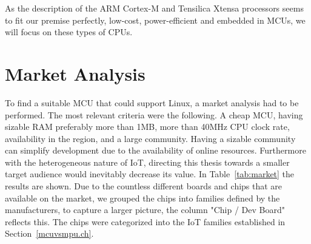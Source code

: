 As the description of the ARM Cortex-M and Tensilica Xtensa processors seems to fit our premise perfectly, low-cost, power-efficient and embedded in MCUs, we will focus on these types of CPUs.


\section{Market Analysis}


To find a suitable MCU that could support Linux, a market analysis had to be performed. The most relevant criteria were the following. A cheap MCU, having sizable RAM preferably more than 1MB, more than 40MHz CPU clock rate, availability in the region, and a large community. Having a sizable community can simplify development due to the availability of online resources. Furthermore with the heterogeneous nature of IoT, directing this thesis towards a smaller target audience would inevitably decrease its value. In Table~\ref{tab:market} the results are shown. Due to the countless different boards and chips that are available on the market, we grouped the chips into families defined by the manufacturers, to capture a larger picture, the column "Chip / Dev Board" reflects this. The chips were categorized into the IoT families established in Section~\ref{mcuvsmpu.ch}.

